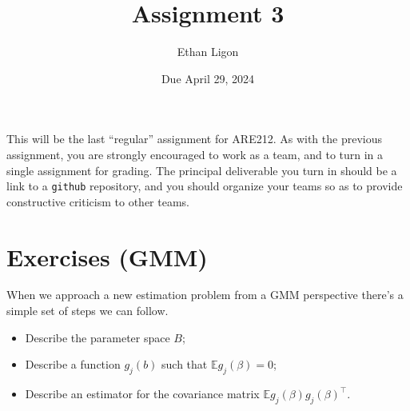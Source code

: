 \documentclass[12pt]{amsart}
\author{Ethan Ligon}
\date{Due April 29, 2024}
\title{Assignment 3}
\newcommand{\T}{\top}
\renewcommand{\E}{\ensuremath{\mathds{E}}}
\begin{document}
\maketitle
This will be the  last ``regular'' assignment for ARE212.   As with the previous assignment, you are strongly encouraged to work as a  team, and to turn in a single assignment for grading.   The principal deliverable you turn in should be a link to a \texttt{github} repository, and you should organize your teams so as to provide constructive criticism to other teams.
\section{Exercises (GMM)}
\label{sec:org77ba220}
When we approach a new estimation problem from a GMM perspective
there's a simple set of steps we can follow.
\begin{itemize}
\item Describe the parameter space \(B\);
\item Describe a function \(g_j(b)\) such that \(\E g_j(\beta)=0\);
\item Describe an estimator for the covariance matrix \(\E g_j(\beta)g_j(\beta)^\T\).


\end{itemize}
\end{document}
